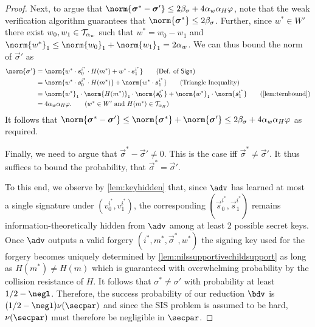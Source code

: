 \begin{proof}
  Next, to argue that $\norm{\vec{\sigma}^*-\vec{\sigma}'}\leq 2\beta_\sigma + 4\alpha_w\alpha_H\varphi$, note that the weak verification algorithm guarantees that $\norm{\vec{\sigma}^*} \leq 2\beta_\sigma$.
  Further, since $w^*\in W'$ there exist $w_0,w_1 \in \mathcal{T}_{\alpha_w}$ such that $w^* = w_0-w_1$ and $\norm{w^*}_1 \leq \norm{w_0}_1 + \norm{w_1}_1 = 2\alpha_w$.
  We can thus bound the norm of $\vec{\sigma}'$ as
  \begin{align*}
    \norm{\vec{\sigma}'} ={}& \norm{w^*\cdot\vec{s}^{i^*}_0\cdot H(m^*)+ w^*\cdot\vec{s}^{i^*}_1}\tag{Def. of $\sign$}\\
    ={}&\norm{w^*\cdot\vec{s}^{i^*}_0\cdot H(m^*)}+ \norm{w^*\cdot\vec{s}^{i^*}_1}\tag{Triangle Inequality}\\
    ={}&\norm{w^*}_1\cdot\norm{H(m^*)}_1\cdot\norm{\vec{s}^{i^*}_0} + \norm{w^*}_1\cdot\norm{\vec{s}^{i^*}_1}\tag{\autoref{lem:ternbound}}\\
    ={}&4\alpha_w\alpha_H\varphi.\tag{$w^*\in W'$ and $H(m^*)\in\tern_{\alpha_H}$}
  \end{align*}
  It follows that $\norm{\vec{\sigma}^*-\vec{\sigma}'} \leq \norm{\vec{\sigma}^*}+\norm{\vec{\sigma}'} \leq 2\beta_\sigma + 4\alpha_w\alpha_H\varphi$ as required.

  Finally, we need to argue that $\vec{\sigma}^*-\vec{\sigma}'\neq 0$.
  This is the case iff $\vec{\sigma}^* \neq \vec{\sigma}'$.
  It thus suffices to bound the probability, that $\vec{\sigma}^*=\vec{\sigma}'$.

  To this end, we observe by \autoref{lem:keyhidden} that, since $\adv$ has learned at most a single signature under $(v_0^{i^*},v_1^{i^*})$, the corresponding $(\vec{s}_0^{i^*},\vec{s}_1^{i^*})$ remains information-theoretically hidden from $\adv$ among at least 2 possible secret keys.
  Once $\adv$ outputs a valid forgery $(i^*,m^*,\vec{\sigma}^*,w^*)$ the signing key used for the forgery becomes uniquely determined by \autoref{lem:nilssupportivechildsupport} as long as $H(m^*)\neq H(m)$ which is guaranteed with overwhelming probability by the collision resistance of $H$.
  It follows that $\sigma^* \neq \sigma'$ with probability at least $1/2 - \negl$.
  Therefore, the success probability of our reduction $\bdv$ is $(1/2 - \negl) \nu(\secpar)$ and since the SIS problem is assumed to be hard, $\nu(\secpar)$ must therefore be negligible in $\secpar$.
  
\end{proof}

